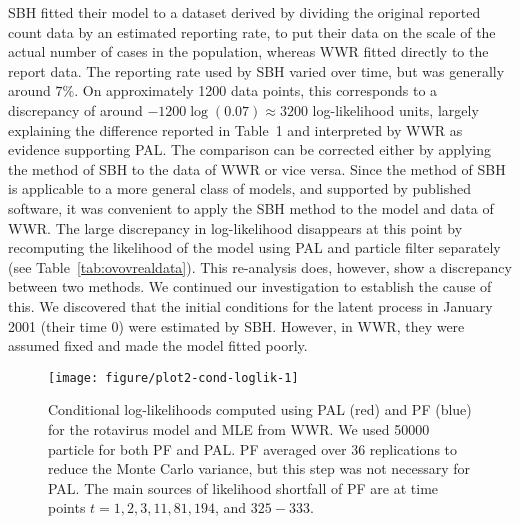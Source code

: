 \documentclass[10pt]{article}\usepackage[]{graphicx}\usepackage[]{xcolor}
\newenvironment{knitrout}{}{} %
\begin{document}
SBH fitted their model to a dataset derived by dividing the original reported count data by an estimated reporting rate, to put their data on the scale of the actual number of cases in the population, whereas WWR fitted directly to the report data.
The reporting rate used by SBH varied over time, but was generally around $7\%$.
On approximately 1200 data points, this corresponds to a discrepancy of around $-1200\log(0.07) \approx 3200$ log-likelihood units, largely explaining the difference reported in Table~1 and interpreted by WWR as evidence supporting PAL.
The comparison can be corrected either by applying the method of SBH to the data of WWR or vice versa.
Since the method of SBH is applicable to a more general class of models, and supported by published software, it was convenient to apply the SBH method to the model and data of WWR.
The large discrepancy in log-likelihood disappears at this point by recomputing the likelihood of the model using PAL and particle filter separately (see Table~\ref{tab:ovovrealdata}).
This re-analysis does, however, show a discrepancy between two methods.
We continued our investigation to establish the cause of this.
We discovered that the initial conditions for the latent process in January 2001 (their time 0) were estimated by SBH. However, in WWR, they were assumed fixed and made the model fitted poorly. 


\begin{knitrout}
\color{fgcolor}\begin{figure}

{\centering \texttt{[image: figure/plot2-cond-loglik-1]} 

}

\caption[Conditional log-likelihoods computed using PAL (red) and PF (blue) for the rotavirus model and MLE from WWR]{Conditional log-likelihoods computed using PAL (red) and PF (blue) for the rotavirus model and MLE from WWR. We used 50000 particle for both PF and PAL. PF averaged over 36 replications to reduce the Monte Carlo variance, but this step was not necessary for PAL. The main sources of likelihood shortfall of PF are at time points $t=1, 2, 3, 11, 81, 194$, and $325-333$.}\label{fig:plot2-cond-loglik}
\end{figure}

\end{knitrout}
\end{document}
